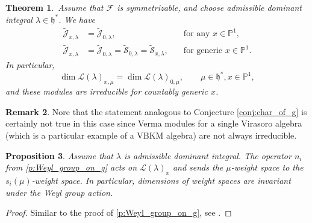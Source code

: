 \documentclass[11pt]{amsart}
\newcommand{\mc}{\mathcal}
\newcommand{\PP}{\mathbb{P}}
\newcommand{\g}{\mathfrak{g}}
\newcommand{\h}{\mathfrak{h}}
\newcommand{\Vir}{\mathrm{Vir}}
\newcommand{\Heis}{\mathrm{Heis}}
\numberwithin{equation}{section}
\theoremstyle{plain}
\newtheorem{theorem}{Theorem}[section]
\newtheorem{proposition}[theorem]{Proposition}
\theoremstyle{definition}
\newtheorem{remark}[theorem]{Remark}
\begin{document}
\begin{theorem}\,\label{t:characters_of_reps_in_families}
    Assume that $\mc F$ is symmetrizable, and choose admissible dominant integral $\lambda\in\h^*$. We have
    \begin{align*}
         \tilde{\mc J}_{x,\lambda}&=\tilde{\mc J}_{0,\lambda},&\text{for any } x\in\PP^1,\\
         \tilde{\mc J}_{x,\lambda}&=\tilde{\mc J}_{0,\lambda}=\tilde{\mc S}_{0,\lambda}=\tilde{\mc S}_{x,\lambda},\quad &\text{for generic } x\in\PP^1.
    \end{align*}
        In particular, 
        $$
        \dim\mc L(\lambda)_{x,\mu}=\dim\mc L(\lambda)_{0,\mu},\qquad \mu\in\h^*,x\in\mathbb P^1,
        $$
        and these modules are irreducible for countably generic $x$. 
         
\end{theorem}
\begin{remark}
    Nore that the statement analogous to Conjecture \ref{conj:char_of_g} is certainly not true in this case since Verma modules for a single Virasoro algebra (which is a particular example of a VBKM algebra) are not always irreducible.
\end{remark}

\begin{proposition}
    Assume that $\lambda$ is admissible dominant integral. The operator $n_i$ from \ref{p:Weyl_group_on_g} acts on $\mc L(\lambda)_x$ and sends the $\mu$-weight space to the $s_i(\mu)$-weight space. In particular, dimensions of weight spaces are invariant under the Weyl group action.
\end{proposition}
\begin{proof}
    Similar to the proof of \ref{p:Weyl_group_on_g}, see \cite[Lemma 3.8]{Kac90}.
\end{proof}

    
\end{document}
